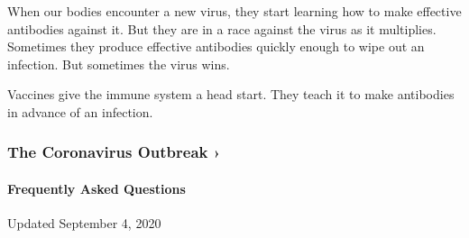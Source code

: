 When our bodies encounter a new virus, they start learning how to make
effective antibodies against it. But they are in a race against the
virus as it multiplies. Sometimes they produce effective antibodies
quickly enough to wipe out an infection. But sometimes the virus wins.

Vaccines give the immune system a head start. They teach it to make
antibodies in advance of an infection.

\href{https://www.nytimes3xbfgragh.onion/news-event/coronavirus?action=click\&pgtype=Article\&state=default\&region=MAIN_CONTENT_3\&context=storylines_faq}{}

\hypertarget{the-coronavirus-outbreak-}{%
\subsubsection{The Coronavirus Outbreak
›}\label{the-coronavirus-outbreak-}}

\hypertarget{frequently-asked-questions}{%
\paragraph{Frequently Asked
Questions}\label{frequently-asked-questions}}

Updated September 4, 2020

